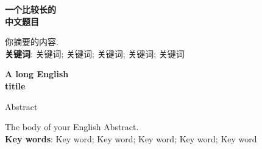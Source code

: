 

\fontsize{12pt}{18pt}\selectfont \setcounter{page}{1}
\begin{center} 
	{\fontsize{15.75pt}{13pt}\selectfont\bf 一个比较长的\\中文题目}
\end{center}
\begin{center}
{\fontsize{15.75pt}{13pt}\selectfont{\bf 摘~要}} \vspace{1.0cm}
\end{center}
你摘要的内容.\\
\textbf{\hei 关键词}: 关键词;  关键词;  关键词;  关键词; 关键词

\newpage
\fontsize{12pt}{18pt}\selectfont 
\begin{center} {\fontsize{15.75pt}{13pt}\selectfont\bf
A long English \\ titile}\end{center}
\begin{center}
{\large Abstract} \vspace{1.0cm}
\end{center}
The body of your English Abstract.\\
\textbf{Key words}: Key word; Key word; Key word; Key word; Key word
\newpage
